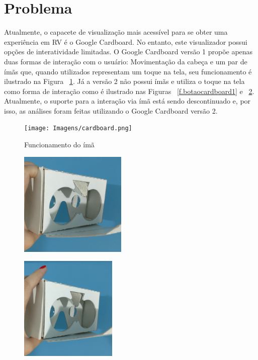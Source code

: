 \section{Problema}
\label{s.problema}

Atualmente, o capacete de visualização mais acessível para se obter uma experiência em RV é o Google Cardboard. No entanto, este visualizador possui opções de interatividade limitadas. O Google Cardboard versão 1 propõe apenas duas formas de interação com o usuário: Movimentação da cabeça e um par de ímãs que, quando utilizados representam um toque na tela, seu funcionamento é ilustrado na Figura ~\ref{f.cardboard1}. Já a versão 2 não possui ímãs e utiliza o toque na tela como forma de interação como é ilustrado nas Figuras ~\ref{f.botaocardboard1} e ~\ref{f.botaocardboard2}. Atualmente, o suporte para a interação via ímã está sendo descontinuado e, por isso, as análises foram feitas utilizando o Google Cardboard versão 2.

\begin{figure}[H]
	\caption{\small Funcionamento do ímã}
	\centering
	\texttt{[image: Imagens/cardboard.png]}
	\label{f.cardboard1}
\end{figure}

\begin{figure}[H]
	
	\begin{minipage}{.5\textwidth}{
			\centering
			\includegraphics[height=5cm]{Imagens/botaocardboard1.jpg}		
			\label{f.botaocardboard1}
		}
	\end{minipage}
	\begin{minipage}{.5\textwidth}{
			\centering
			\includegraphics[height=5cm]{Imagens/botaocardboard2.jpg}		
			\label{f.botaocardboard2}	
		}
	\end{minipage}
\end{figure}

